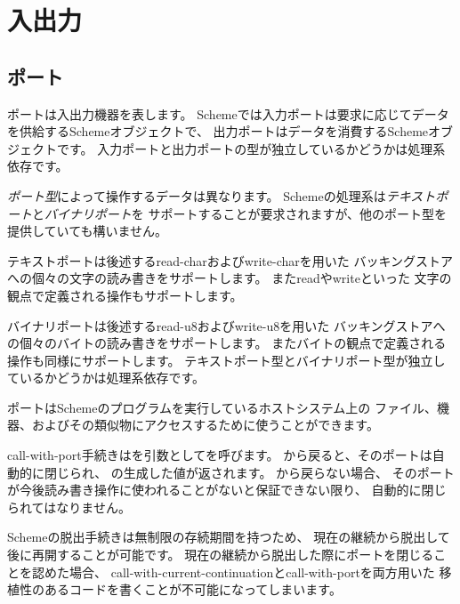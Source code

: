 \section{入出力}

\subsection{ポート}
\label{portsection}

ポートは入出力機器を表します。
Schemeでは入力ポートは要求に応じてデータを供給するSchemeオブジェクトで、
出力ポートはデータを消費するSchemeオブジェクトです。
入力ポートと出力ポートの型が独立しているかどうかは処理系依存です。

{\em ポート型}によって操作するデータは異なります。
Schemeの処理系は{\em テキストポート}と{\em バイナリポート}を
サポートすることが要求されますが、他のポート型を提供していても構いません。

テキストポートは後述する{\cf read-char}および{\cf write-char}を用いた
バッキングストアへの個々の文字の読み書きをサポートします。
また{\cf read}や{\cf write}といった
文字の観点で定義される操作もサポートします。

バイナリポートは後述する{\cf read-u8}および{\cf write-u8}を用いた
バッキングストアへの個々のバイトの読み書きをサポートします。
またバイトの観点で定義される操作も同様にサポートします。
テキストポート型とバイナリポート型が独立しているかどうかは処理系依存です。

ポートはSchemeのプログラムを実行しているホストシステム上の
ファイル、機器、およびその類似物にアクセスするために使うことができます。

\begin{entry}{%
}

{\cf call-with-port}手続きはを引数としてを呼びます。
から戻ると、そのポートは自動的に閉じられ、
の生成した値が返されます。
から戻らない場合、
そのポートが今後読み書き操作に使われることがないと保証できない限り、
自動的に閉じられてはなりません。

\begin{rationale}
Schemeの脱出手続きは無制限の存続期間を持つため、
現在の継続から脱出して後に再開することが可能です。
現在の継続から脱出した際にポートを閉じることを認めた場合、
{\cf call-with-current-continuation}と{\cf call-with-port}を両方用いた
移植性のあるコードを書くことが不可能になってしまいます。
\end{rationale} 

\end{entry}

